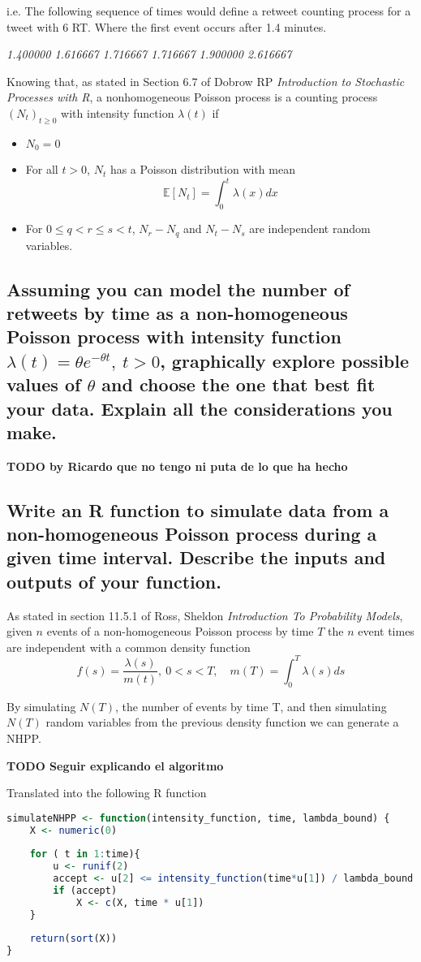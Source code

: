 i.e. The following sequence of times would define a retweet counting process for a tweet with 6 RT. Where the first event occurs after 1.4 minutes.

\begin{center}
\textit{1.400000    1.616667    1.716667    1.716667    1.900000    2.616667}
\end{center}

Knowing that, as stated in Section 6.7 of Dobrow RP \textit{Introduction to Stochastic Processes with R}, a nonhomogeneous Poisson process is a counting process $(N_t)_{t\geq0}$ with intensity function $\lambda(t)$ if
\begin{itemize}
	\item $N_0 = 0$ 
	\item For all $t>0$, $N_t$ has a Poisson distribution with mean
	\[\mathbb{E}[N_t] = \int^t_0\lambda(x)dx\]
	\item For $0\leq q < r \leq s < t$, $N_r - N_q$ and $N_t - N_s$ are independent random variables.
\end{itemize}



\subsection{Assuming you can model the number of retweets by time as a non-homogeneous Poisson process with intensity function $ \lambda (t) = \theta e^{-\theta t},\ t>0$, graphically explore possible values of $\theta$ and choose the one that best fit your data. Explain all the considerations you make.}

\textbf{TODO by Ricardo que no tengo ni puta de lo que ha hecho}

\subsection{Write an R function to simulate data from a non-homogeneous Poisson process during a given time interval. Describe the inputs and outputs of your function.}

As stated in section 11.5.1 of Ross, Sheldon \textit{Introduction To Probability Models}, given $n$ events of a non-homogeneous Poisson process by time $T$ the $n$ event times are independent with a common density function
\[f(s) = \frac{\lambda(s)}{m(t)},\ 0<s<T, \quad m(T) = \int^T_0\lambda(s)ds\]

By simulating $N(T)$, the number of events by time T, and then simulating $N(T)$ random variables from the previous density function we can generate a NHPP.

\textbf{TODO Seguir explicando el algoritmo}

Translated into the following R function
\begin{lstlisting}[language=r]
simulateNHPP <- function(intensity_function, time, lambda_bound) {
	X <- numeric(0)
	
	for ( t in 1:time){
		u <- runif(2)
		accept <- u[2] <= intensity_function(time*u[1]) / lambda_bound
		if (accept)
			X <- c(X, time * u[1])
	}
		
	return(sort(X))
}
\end{lstlisting}
